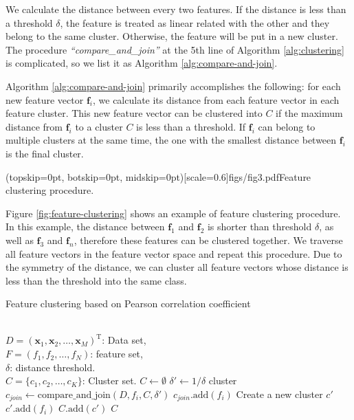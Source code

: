 \documentclass{ieeeaccess}
\theoremstyle{definition}
\begin{document}
We calculate the distance between every two features. If the distance is less than a threshold $\delta$, the feature is treated as linear related with the other and they belong to the same cluster. Otherwise, the feature will be put in a new cluster. The procedure \emph{``compare\_and\_join''} at the 5th line of Algorithm \ref{alg:clustering} is complicated, so we list it as Algorithm \ref{alg:compare-and-join}.

Algorithm \ref{alg:compare-and-join} primarily accomplishes the following: for each new feature vector $\bm{f}_i$, we calculate its distance from each feature vector in each feature cluster. This new feature vector can be clustered into $C$ if the maximum distance from $\bm{f}_i$ to a cluster $C$ is less than a threshold. 
If $\bm{f}_i$ can belong to multiple clusters at the same time, the one with the smallest distance between $\bm{f}_i$ is the final cluster.

\Figure[!htpb](topskip=0pt, botskip=0pt, midskip=0pt)[scale=0.6]{figs/fig3.pdf}{Feature clustering procedure. \label{fig:feature-clustering}}

Figure \ref{fig:feature-clustering} shows an example of feature clustering procedure. In this example, the distance between $\bm{f}_1$ and $\bm{f}_2$ is shorter than threshold $\delta$, as well as $\bm{f}_3$ and $\bm{f}_n$, therefore these features can be clustered together. We traverse all feature vectors in the feature vector space and repeat this procedure. Due to the symmetry of the distance, we can cluster all feature vectors whose distance is less than the threshold into the same class. 

\begin{algorithm}
    \caption{Feature clustering based on Pearson correlation coefficient}
    \label{alg:clustering}
    \begin{algorithmic}[1]
    \REQUIRE ~~\\
        $D=(\bm{x}_1,\bm{x}_2,\ldots,\bm{x}_M)^\text{T}$: Data set, \\
        $F=(f_1,f_2,\ldots,f_N)$: feature set, \\
        $\delta$: distance threshold.
    \ENSURE ~~\\
        $C=\{c_1,c_2,\ldots,c_K\}$: Cluster set.
    \STATE $C \gets \emptyset$
    \STATE $\delta' \gets 1 / \delta$
            \STATE cluster $c_{join} \gets \text{compare\_and\_join}(D, f_i, C, \delta')$
                \STATE $c_{join}\text{.add}(f_i)$
            \ELSE
                \STATE Create a new cluster $c'$
                \STATE $c'\text{.add}(f_i)$
                \STATE $C\text{.add}(c')$
            \ENDIF
        \ENDIF
    \ENDFOR
    \RETURN $C$
    \end{algorithmic}
    \end{algorithm}
\end{document}
